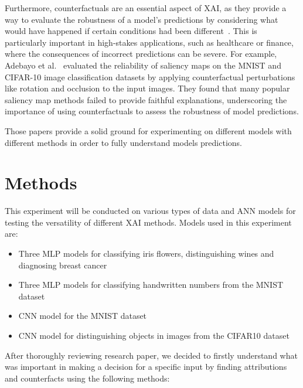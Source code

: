\documentclass[journal, a4paper]{IEEEtran}
\begin{document}
Furthermore, counterfactuals are an essential aspect of XAI, as they provide a way to evaluate the robustness of a model's predictions by considering what would have happened if certain conditions had been different~\cite{adebayo2018sanity}.
This is particularly important in high-stakes applications, such as healthcare or finance, where the consequences of incorrect predictions can be severe.
For example, Adebayo et al.~\cite{adebayo2018sanity} evaluated the reliability of saliency maps on the MNIST and CIFAR-10 image classification datasets by applying counterfactual perturbations like rotation and occlusion to the input images.
They found that many popular saliency map methods failed to provide faithful explanations, underscoring the importance of using counterfactuals to assess the robustness of model predictions.

Those papers provide a solid ground for experimenting on different models with different methods in order to fully understand models predictions.
\section{Methods}\label{sec:methodology}

This experiment will be conducted on various types of data and ANN models for testing the versatility of different XAI methods.
Models used in this experiment are:
\begin{itemize}
    \item Three MLP models for classifying iris flowers, distinguishing wines and diagnosing breast cancer
    \item Three MLP models for classifying handwritten numbers from the MNIST dataset
    \item CNN model for the MNIST dataset
    \item CNN model for distinguishing objects in images from the CIFAR10 dataset
\end{itemize}

After thoroughly reviewing research paper, we decided to firstly understand what was important in making a decision for a specific input by finding attributions and counterfacts using the following methods:
\end{document}
